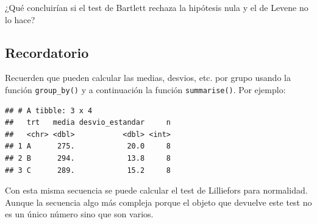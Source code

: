 \documentclass[]{book}
\newenvironment{Shaded}{\begin{snugshade}}{\end{snugshade}}
\newcommand{\DataTypeTok}[1]{\textcolor[rgb]{0.13,0.29,0.53}{#1}}
\newcommand{\KeywordTok}[1]{\textcolor[rgb]{0.13,0.29,0.53}{\textbf{#1}}}
\newcommand{\NormalTok}[1]{#1}
\newcommand{\OperatorTok}[1]{\textcolor[rgb]{0.81,0.36,0.00}{\textbf{#1}}}
\newcommand{\StringTok}[1]{\textcolor[rgb]{0.31,0.60,0.02}{#1}}
\theoremstyle{definition}
\theoremstyle{definition}
\theoremstyle{definition}
\theoremstyle{remark}
\let\BeginKnitrBlock\begin \let\EndKnitrBlock\end
\begin{document}
\BeginKnitrBlock{exercise}
\protect\hypertarget{exr:unnamed-chunk-5}{}{\label{exr:unnamed-chunk-5}
}¿Qué concluirían si el test de Bartlett rechaza la hipótesis nula y el
de Levene no lo hace?
\EndKnitrBlock{exercise}

\hypertarget{recordatorio}{%
\subsection{Recordatorio}\label{recordatorio}}

Recuerden que pueden calcular las medias, desvios, etc. por grupo usando
la función \texttt{group\_by()} y a continuación la función
\texttt{summarise()}. Por ejemplo:

\begin{Shaded}
\end{Shaded}

\begin{verbatim}
## # A tibble: 3 x 4
##   trt   media desvio_estandar     n
##   <chr> <dbl>           <dbl> <int>
## 1 A      275.            20.0     8
## 2 B      294.            13.8     8
## 3 C      289.            15.2     8
\end{verbatim}

Con esta misma secuencia se puede calcular el test de Lilliefors para
normalidad. Aunque la secuencia algo más compleja porque el objeto que
devuelve este test no es un único número sino que son varios.

\begin{Shaded}
\end{Shaded}
\end{document}
